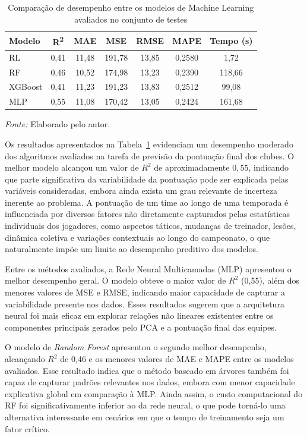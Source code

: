 \begin{table}[H]
\centering
\caption{Comparação de desempenho entre os modelos de Machine Learning avaliados no conjunto de testes}
\label{tab:comparacao_modelos}
\begin{tabular}{lcccccc}
\hline
\textbf{Modelo} & \textbf{R\textsuperscript{2}} & \textbf{MAE} & \textbf{MSE} & \textbf{RMSE} & \textbf{MAPE} & \textbf{Tempo (s)} \\
\hline
RL      & 0,41 & 11,48 & 191,78 & 13,85 & 0,2580 & 1,72 \\
RF      & 0,46 & 10,52 & 174,98 & 13,23 & 0,2390 & 118,66 \\
XGBoost & 0,41 & 11,23 & 191,23 & 13,83 & 0,2512 & 99,08 \\
MLP     & 0,55 & 11,08 & 170,42 & 13,05 & 0,2424 & 161,68 \\
\hline
\end{tabular}

\vspace{0.3cm}
{\footnotesize \textit{Fonte:} Elaborado pelo autor.}

\end{table}

Os resultados apresentados na Tabela~\ref{tab:comparacao_modelos} evidenciam um desempenho moderado dos algoritmos avaliados na tarefa de previsão da 
pontuação final dos clubes. O melhor modelo alcançou um valor de $R^2$ de aproximadamente $0{,}55$, indicando que parte significativa da variabilidade 
da pontuação pode ser explicada pelas variáveis consideradas, embora ainda exista um grau relevante de incerteza inerente ao problema. A pontuação de um time 
ao longo de uma temporada é influenciada por diversos fatores não diretamente capturados pelas estatísticas individuais dos jogadores, como aspectos táticos, 
mudanças de treinador, lesões, dinâmica coletiva e variações contextuais ao longo do campeonato, o que naturalmente impõe um limite ao desempenho preditivo dos modelos.

Entre os métodos avaliados, a Rede Neural Multicamadas (MLP) apresentou o melhor desempenho geral. O modelo obteve o maior valor de $R^2$ (0{,}55), além dos 
menores valores de MSE e RMSE, indicando maior capacidade de capturar a variabilidade presente nos dados. Esses resultados sugerem que a arquitetura neural foi 
mais eficaz em explorar relações não lineares existentes entre os componentes principais gerados pelo PCA e a pontuação final das equipes.

O modelo de \textit{Random Forest} apresentou o segundo melhor desempenho, alcançando $R^2$ de 0{,}46 e os menores valores de MAE e MAPE entre os 
modelos avaliados. Esse resultado indica que o método baseado em árvores também foi capaz de capturar padrões relevantes nos dados, embora com menor 
capacidade explicativa global em comparação à MLP. Ainda assim, o custo computacional do RF foi significativamente inferior ao da rede neural, o que pode 
torná-lo uma alternativa interessante em cenários em que o tempo de treinamento seja um fator crítico.

